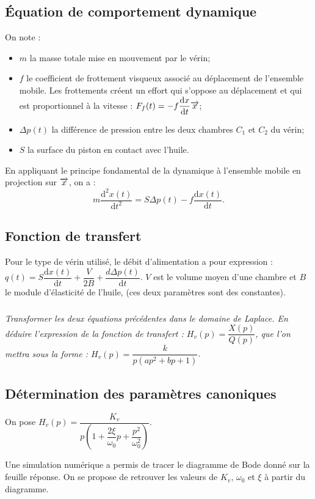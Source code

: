 \documentclass[10pt,fleqn]{article} %
\begin{document}
\begin{multicols}{2}
\subsection*{Équation de comportement dynamique}
On note : 
\begin{itemize}
\item $m$ la masse totale mise en mouvement par le vérin;
\item $f$ le coefficient de frottement visqueux associé au déplacement de l’ensemble mobile. Les frottements créent un effort qui s’oppose au déplacement et qui est proportionnel à la vitesse : $F_f(t)=-f\dfrac{\text{d} x}{\text{d} t} \overrightarrow{x}$;
\item $\Delta p(t)$ la différence de pression entre les deux chambres $C_1$ et $C_2$ du vérin;
\item $S$ la surface du piston en contact avec l’huile.
\end{itemize}
En appliquant le principe fondamental de la dynamique à l’ensemble mobile en projection sur $\overrightarrow{x}$, on a : 
$$m\dfrac{\text{d}^2 x(t) }{\text{d}t^2}=S\Delta p(t)-f\dfrac{\text{d} x(t) }{\text{d}t}.$$



\subsection*{Fonction de transfert}
Pour le type de vérin utilisé, le débit d'alimentation a pour expression : $q(t)=S\dfrac{\text{d}x(t)}{\text{d} t}+\dfrac{V}{2B}+\dfrac{d\Delta p(t)}{\text{d}t}$. $V$ est le volume moyen d’une chambre et $B$ le module d’élasticité de l’huile, (ces deux paramètres sont des constantes).

\subparagraph{}\textit{Transformer les deux équations précédentes dans le domaine de Laplace. En déduire l’expression de la fonction de transfert : $H_v(p)=\dfrac{X(p)}{Q(p)}$, que l’on mettra sous la forme : $H_v(p)=\dfrac{k}{p\left( ap^2 + bp + 1\right)}$}.


\subsection*{Détermination des paramètres canoniques}

On pose $H_v(p)=\dfrac{K_v}{p\left( 1+\dfrac{2\xi}{\omega_0} p + \dfrac{p^2}{\omega_0^2} \right)}$. 

Une simulation numérique a permis de tracer le diagramme de Bode donné sur la feuille réponse. On se propose de retrouver les valeurs de $K_v$, $\omega_0$ et $\xi$ à partir du diagramme.


\end{multicols}
\end{document}
